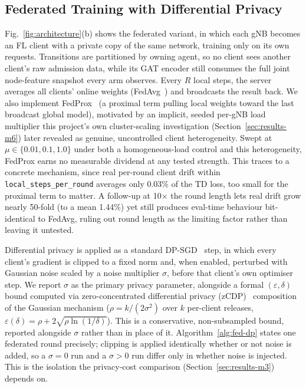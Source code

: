 \documentclass[pdflatex,sn-basic,Numbered]{sn-jnl}%
\begin{document}
\subsection{Federated Training with Differential Privacy}
Fig.~\ref{fig:architecture}(b) shows the federated variant, in which each gNB becomes an FL client with a private copy of the same network, training only on its own requests. Transitions are partitioned by owning agent, so no client sees another client's raw admission data, while its GAT encoder still consumes the full joint node-feature snapshot every arm observes. Every $R$ local steps, the server averages all
clients' online weights (FedAvg~\cite{fedavg}) and broadcasts the
result back. We also implement FedProx~\cite{fedprox} (a proximal term pulling local weights toward the last broadcast global model), motivated by an implicit, seeded per-gNB load multiplier this project's own cluster-scaling investigation (Section~\ref{sec:results-m6}) later revealed as genuine, uncontrolled client heterogeneity. Swept at $\mu \in \{0.01, 0.1, 1.0\}$ under both a homogeneous-load control and this heterogeneity, FedProx earns no measurable dividend at any tested strength. This traces to a concrete mechanism, since real per-round client drift within \texttt{local\_steps\_per\_round} averages only 0.03\% of the TD loss, too small for the proximal term to matter. A follow-up at 10$\times$ the round length lets real drift grow nearly 50-fold (to a mean 1.44\%) yet still produces eval-time behaviour bit-identical to FedAvg, ruling out round length as the limiting factor rather than leaving it untested.

Differential privacy is applied as a standard DP-SGD~\cite{dpsgd} step, in which every client's gradient is clipped to a fixed norm and, when enabled, perturbed with Gaussian noise scaled by a noise multiplier $\sigma$, before that client's own optimiser step. We report $\sigma$ as the
primary privacy parameter, alongside a formal $(\varepsilon,\delta)$
bound computed via zero-concentrated differential privacy
(zCDP)~\cite{zcdp} composition of the Gaussian mechanism ($\rho =
k/(2\sigma^2)$ over $k$ per-client releases,
$\varepsilon(\delta)=\rho+2\sqrt{\rho\ln(1/\delta)}$). This is a conservative, non-subsampled bound, reported alongside $\sigma$ rather than in place of it. Algorithm~\ref{alg:fed-dp} states one federated round precisely;
clipping is applied identically whether or not noise is added, so a $\sigma{=}0$ run and a $\sigma{>}0$ run differ only in whether noise is injected. This is the isolation the privacy-cost comparison (Section~\ref{sec:results-m3}) depends on.
\end{document}
